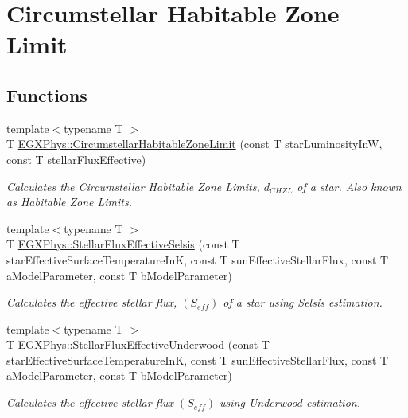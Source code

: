 \hypertarget{group___e_g_x_phys-_circumstellar_habitable_zone_limit}{}\section{Circumstellar Habitable Zone Limit}
\label{group___e_g_x_phys-_circumstellar_habitable_zone_limit}
\subsection*{Functions}
\begin{DoxyCompactItemize}
\item 
{\footnotesize template$<$typename T $>$ }\\T \mbox{\hyperlink{group___e_g_x_phys-_circumstellar_habitable_zone_limit_ga809f4c557ce6d2fe566a69c2a8a5d41b}{E\+G\+X\+Phys\+::\+Circumstellar\+Habitable\+Zone\+Limit}} (const T star\+Luminosity\+InW, const T stellar\+Flux\+Effective)
\begin{DoxyCompactList}\small\item\em Calculates the Circumstellar Habitable Zone Limits, $d_{CHZL}$ of a star. Also known as Habitable Zone Limits. \end{DoxyCompactList}\item 
{\footnotesize template$<$typename T $>$ }\\T \mbox{\hyperlink{group___e_g_x_phys-_circumstellar_habitable_zone_limit_ga0eb1003b4cfcbcafde635cefca5ae5c2}{E\+G\+X\+Phys\+::\+Stellar\+Flux\+Effective\+Selsis}} (const T star\+Effective\+Surface\+Temperature\+InK, const T sun\+Effective\+Stellar\+Flux, const T a\+Model\+Parameter, const T b\+Model\+Parameter)
\begin{DoxyCompactList}\small\item\em Calculates the effective stellar flux, $(S_{eff})$ of a star using Selsis estimation. \end{DoxyCompactList}\item 
{\footnotesize template$<$typename T $>$ }\\T \mbox{\hyperlink{group___e_g_x_phys-_circumstellar_habitable_zone_limit_gafe02cffcc63c39794feb6f1de5e7a9bb}{E\+G\+X\+Phys\+::\+Stellar\+Flux\+Effective\+Underwood}} (const T star\+Effective\+Surface\+Temperature\+InK, const T sun\+Effective\+Stellar\+Flux, const T a\+Model\+Parameter, const T b\+Model\+Parameter)
\begin{DoxyCompactList}\small\item\em Calculates the effective stellar flux $(S_{eff})$ using Underwood estimation. \end{DoxyCompactList}\item 

\end{DoxyCompactItemize}
